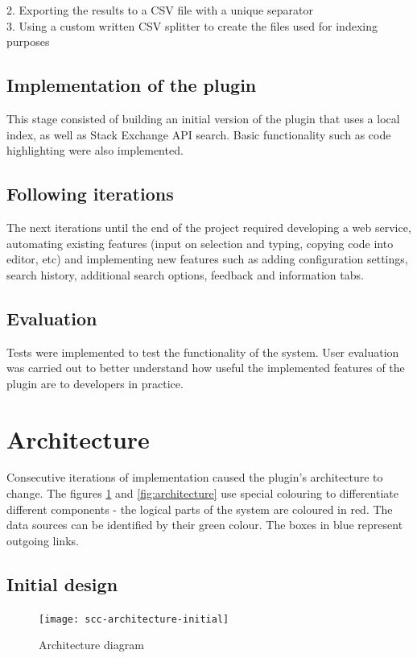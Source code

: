 \documentclass{l4proj}
\begin{document}
2. Exporting the results to a CSV file with a unique separator\\
3. Using a custom written CSV splitter to create the files used for indexing purposes

\subsection{Implementation of the plugin}
This stage consisted of building an initial version of the plugin that uses a local index, as well as Stack Exchange API search. Basic functionality such as code highlighting were also implemented.

\subsection{Following iterations}
The next iterations until the end of the project required developing a web service, automating existing features (input on selection and typing, copying code into editor, etc) and implementing new features such as adding configuration settings, search history, additional search options, feedback and information tabs.

\subsection{Evaluation}
Tests were implemented to test the functionality of the system. User evaluation was carried out to better understand how useful the implemented features of the plugin are to developers in practice. 

\section{Architecture}
Consecutive iterations of implementation caused the plugin's architecture to change. The figures \ref{fig:architecture-initial} and \ref{fig:architecture} use special colouring to differentiate different components - the logical parts of the system are coloured in red. The data sources can be identified by their green colour. The boxes in blue represent outgoing links.

\subsection{Initial design}

\begin{figure}[H]
\texttt{[image: scc-architecture-initial]}
\centering
\caption{Architecture diagram}\label{scc-architecture-initial}
\label{fig:architecture-initial}
\end{figure}
\end{document}
